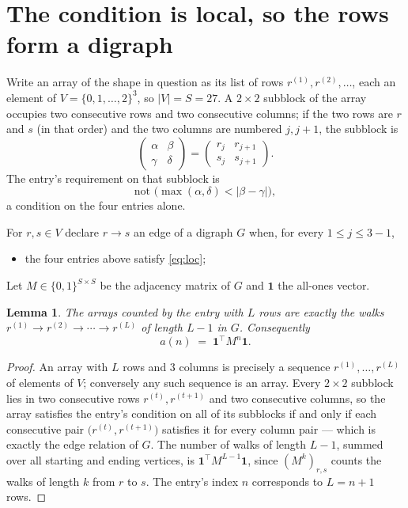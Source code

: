 \documentclass[11pt,a4paper]{article}
\theoremstyle{plain}
\newtheorem{lemma}[theorem]{Lemma}
\theoremstyle{definition}
\begin{document}
\section{The condition is local, so the rows form a digraph}

Write an array of the shape in question as its list of rows
$r^{(1)},r^{(2)},\dots$, each an element of
$V=\{0,1,\dots,2\}^{3}$, so $|V|=S=27$. A $2\times2$ subblock of the array
occupies two consecutive rows and two consecutive columns; if the two rows are $r$
and $s$ (in that order) and the two columns are numbered $j,j+1$,
the subblock is
\[
\begin{pmatrix}\alpha&\beta\\\gamma&\delta\end{pmatrix}=\begin{pmatrix}r_j&r_{j+1}\\s_j&s_{j+1}\end{pmatrix}.
\]
The entry's requirement on that subblock is
\begin{equation}\label{eq:loc}
\text{not }\bigl(\max(\alpha,\delta)<|\beta-\gamma|\bigr),
\end{equation}
a condition on the four entries alone.

For $r,s\in V$ declare $r\to s$ an edge of a digraph $G$ when, for every
$1\le j\le 3-1$,
\begin{itemize}
\item the four entries above satisfy \eqref{eq:loc};

\end{itemize}
Let $M\in\{0,1\}^{S\times S}$ be the adjacency matrix of $G$ and $\mathbf{1}$ the
all-ones vector.

\begin{lemma}\label{lem:walk}
The arrays counted by the entry with $L$ rows are exactly the walks
$r^{(1)}\to r^{(2)}\to\cdots\to r^{(L)}$ of length $L-1$ in $G$. Consequently
\[
a(n)\;=\;\mathbf{1}^{\!\top}M^{n}\mathbf{1} .
\]
\end{lemma}

\begin{proof}
An array with $L$ rows and $3$ columns is precisely a sequence
$r^{(1)},\dots,r^{(L)}$ of elements of $V$; conversely any such sequence is an array.
Every $2\times2$ subblock lies in two consecutive rows $r^{(t)},r^{(t+1)}$ and two
consecutive columns, so the array satisfies the entry's condition on all of its subblocks
if and only if each consecutive pair $\bigl(r^{(t)},r^{(t+1)}\bigr)$ satisfies it for
every column pair --- which is exactly the edge relation of $G$. The number of walks of
length $L-1$, summed over all starting and ending vertices, is
$\mathbf{1}^{\!\top}M^{L-1}\mathbf{1}$, since $(M^{k})_{r,s}$ counts the walks of
length $k$ from $r$ to $s$. The entry's index $n$ corresponds to $L=n+1$ rows.
\end{proof}
\end{document}

